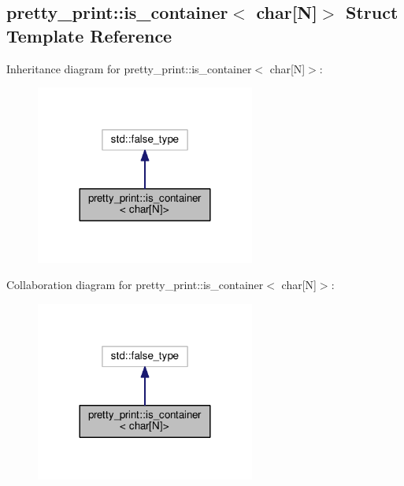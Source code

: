 \hypertarget{structpretty__print_1_1is__container_3_01char[N]_4}{}\subsection{pretty\+\_\+print\+:\+:is\+\_\+container$<$ char\mbox{[}N\mbox{]}$>$ Struct Template Reference}
\label{structpretty__print_1_1is__container_3_01char[N]_4}


Inheritance diagram for pretty\+\_\+print\+:\+:is\+\_\+container$<$ char\mbox{[}N\mbox{]}$>$\+:
\nopagebreak
\begin{figure}[H]
\begin{center}
\leavevmode
\includegraphics[width=204pt]{structpretty__print_1_1is__container_3_01char[N]_4__inherit__graph}
\end{center}
\end{figure}


Collaboration diagram for pretty\+\_\+print\+:\+:is\+\_\+container$<$ char\mbox{[}N\mbox{]}$>$\+:
\nopagebreak
\begin{figure}[H]
\begin{center}
\leavevmode
\includegraphics[width=204pt]{structpretty__print_1_1is__container_3_01char[N]_4__coll__graph}
\end{center}
\end{figure}


